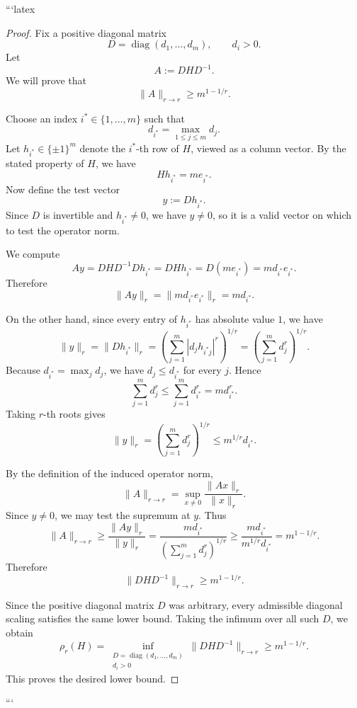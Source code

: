 ```latex
\begin{proof}
Fix a positive diagonal matrix
\[
D=\operatorname{diag}(d_1,\ldots,d_m),
\qquad d_i>0.
\]
Let
\[
A:=DHD^{-1}.
\]
We will prove that
\[
\|A\|_{r\to r}\ge m^{1-1/r}.
\]

Choose an index \(i^*\in\{1,\ldots,m\}\) such that
\[
d_{i^*}=\max_{1\le j\le m} d_j.
\]
Let \(h_{i^*}\in\{\pm 1\}^m\) denote the \(i^*\)-th row of \(H\), viewed as a column vector. By the stated property of \(H\), we have
\[
Hh_{i^*}=me_{i^*}.
\]
Now define the test vector
\[
y:=Dh_{i^*}.
\]
Since \(D\) is invertible and \(h_{i^*}\neq 0\), we have \(y\neq 0\), so it is a valid vector on which to test the operator norm.

We compute
\[
Ay
=
DHD^{-1}Dh_{i^*}
=
DHh_{i^*}
=
D(me_{i^*})
=
md_{i^*}e_{i^*}.
\]
Therefore
\[
\|Ay\|_r
=
\|md_{i^*}e_{i^*}\|_r
=
md_{i^*}.
\]

On the other hand, since every entry of \(h_{i^*}\) has absolute value \(1\), we have
\[
\|y\|_r
=
\|Dh_{i^*}\|_r
=
\left(\sum_{j=1}^m |d_j h_{i^*j}|^r\right)^{1/r}
=
\left(\sum_{j=1}^m d_j^r\right)^{1/r}.
\]
Because \(d_{i^*}=\max_j d_j\), we have \(d_j\le d_{i^*}\) for every \(j\). Hence
\[
\sum_{j=1}^m d_j^r
\le
\sum_{j=1}^m d_{i^*}^r
=
m d_{i^*}^r.
\]
Taking \(r\)-th roots gives
\[
\|y\|_r
=
\left(\sum_{j=1}^m d_j^r\right)^{1/r}
\le
m^{1/r}d_{i^*}.
\]

By the definition of the induced operator norm,
\[
\|A\|_{r\to r}
=
\sup_{x\neq 0}\frac{\|Ax\|_r}{\|x\|_r}.
\]
Since \(y\neq 0\), we may test the supremum at \(y\). Thus
\[
\|A\|_{r\to r}
\ge
\frac{\|Ay\|_r}{\|y\|_r}
=
\frac{md_{i^*}}{\left(\sum_{j=1}^m d_j^r\right)^{1/r}}
\ge
\frac{md_{i^*}}{m^{1/r}d_{i^*}}
=
m^{1-1/r}.
\]
Therefore
\[
\|DHD^{-1}\|_{r\to r}\ge m^{1-1/r}.
\]

Since the positive diagonal matrix \(D\) was arbitrary, every admissible diagonal scaling satisfies the same lower bound. Taking the infimum over all such \(D\), we obtain
\[
\rho_r(H)
=
\inf_{\substack{D=\operatorname{diag}(d_1,\ldots,d_m)\\ d_i>0}}
\|DHD^{-1}\|_{r\to r}
\ge
m^{1-1/r}.
\]
This proves the desired lower bound.
\end{proof}
```